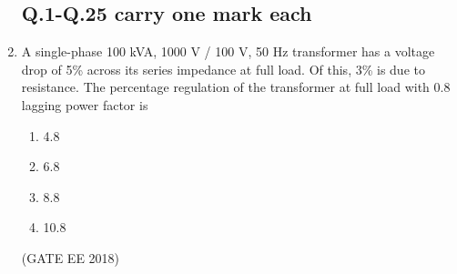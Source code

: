 \documentclass[journal,12pt,onecolumn]{IEEEtran}
\theoremstyle{remark}
\begin{document}
\begin{enumerate}
\subsection{Q.1-Q.25 carry one mark each}
\item A single-phase 100 kVA, 1000 V / 100 V, 50 Hz transformer has a voltage drop of 5\% across its series impedance at full load. Of this, 3\% is due to resistance. The percentage regulation of the transformer at full load with 0.8 lagging power factor is
\begin{multicols}{4}
    \begin{enumerate}
        \item 4.8
        \item 6.8
        \item 8.8
        \item 10.8
    \end{enumerate}
    \end{multicols}
\hfill{(GATE EE 2018)}


\end{enumerate}
\end{document}
